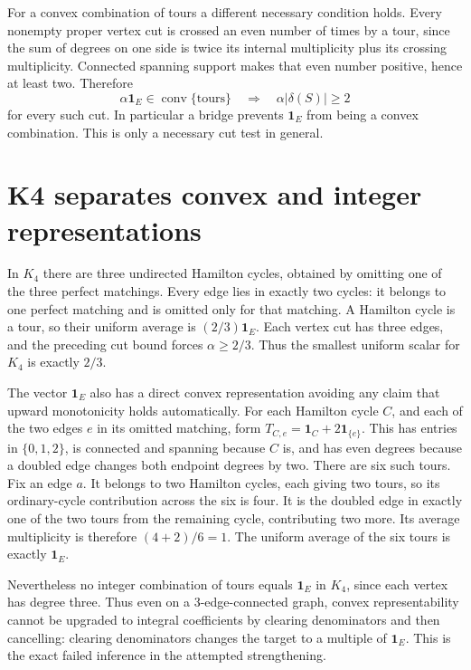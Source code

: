 \documentclass[11pt]{article}
\begin{document}
For a convex combination of tours a different necessary condition holds.
Every nonempty proper vertex cut is crossed an even number of times by a
tour, since the sum of degrees on one side is twice its internal multiplicity
plus its crossing multiplicity. Connected spanning support makes that even
number positive, hence at least two. Therefore
\[
\alpha\mathbf1_E\in\operatorname{conv}\{\text{tours}\}
\quad\Longrightarrow\quad \alpha|\delta(S)|\ge2
\]
for every such cut. In particular a bridge prevents $\mathbf1_E$ from
being a convex combination. This is only a necessary cut test in general.

\section{K4 separates convex and integer representations}
In $K_4$ there are three undirected Hamilton cycles, obtained by omitting one
of the three perfect matchings. Every edge lies in exactly two cycles:
it belongs to one perfect matching and is omitted only for that matching.
A Hamilton cycle is a tour, so their uniform average is
$(2/3)\mathbf1_E$. Each vertex cut has three edges, and the preceding cut
bound forces $\alpha\ge2/3$. Thus the smallest uniform scalar for $K_4$
is exactly $2/3$.

The vector $\mathbf1_E$ also has a direct convex representation avoiding any
claim that upward monotonicity holds automatically. For each Hamilton cycle
$C$, and each of the two edges $e$ in its omitted matching, form
$T_{C,e}=\mathbf1_C+2\mathbf1_{\{e\}}$. This has entries in $\{0,1,2\}$,
is connected and spanning because $C$ is, and has even degrees because a
doubled edge changes both endpoint degrees by two. There are six such tours.
Fix an edge $a$. It belongs to two Hamilton cycles, each giving two tours,
so its ordinary-cycle contribution across the six is four. It is the doubled
edge in exactly one of the two tours from the remaining cycle, contributing
two more. Its average multiplicity is therefore $(4+2)/6=1$.
The uniform average of the six tours is exactly $\mathbf1_E$.

Nevertheless no integer combination of tours equals $\mathbf1_E$ in $K_4$,
since each vertex has degree three. Thus even on a 3-edge-connected graph,
convex representability cannot be upgraded to integral coefficients by
clearing denominators and then cancelling: clearing denominators changes
the target to a multiple of $\mathbf1_E$. This is the exact failed inference
in the attempted strengthening.
\end{document}
